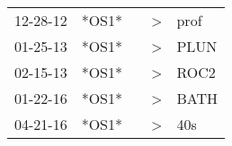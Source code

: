 \begin{supertabular}{lllll}
 12-28-12 &  *OS1* &   &  \textgreater &  prof \\
 01-25-13 &  *OS1* &   &  \textgreater &  PLUN \\
 02-15-13 &  *OS1* &   &  \textgreater &  ROC2 \\
 01-22-16 &  *OS1* &   &  \textgreater &  BATH \\
 04-21-16 &  *OS1* &   &  \textgreater &   40s \\
\end{supertabular}
